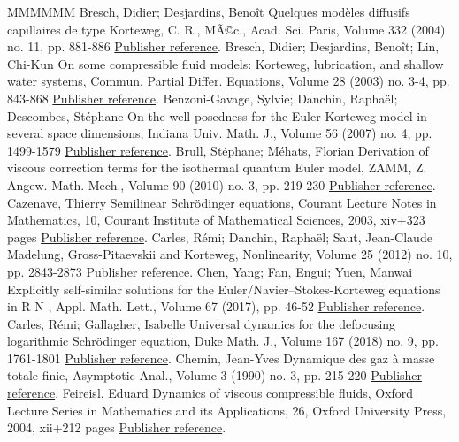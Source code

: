 \documentclass[11pt]{article}
\theoremstyle{definition}
\numberwithin{equation}{section}
\numberwithin{figure}{section}
\numberwithin{table}{section}
\newcommand*\<{\left\langle}
\renewcommand*\>{\right\rangle}
\begin{document}
\begin{thebibliography}{MMMMMM}
 Bresch, Didier; Desjardins, Benoît Quelques modèles diffusifs capillaires de type Korteweg, C. R., MÃ©c., Acad. Sci. Paris, Volume 332 (2004) no. 11, pp. 881-886 \href{https://ahl.centre-mersenne.org/item/AHL_2018__1__47_0/#BD04}{Publisher reference}.
 Bresch, Didier; Desjardins, Benoît; Lin, Chi-Kun On some compressible fluid models: Korteweg, lubrication, and shallow water systems, Commun. Partial Differ. Equations, Volume 28 (2003) no. 3-4, pp. 843-868 \href{https://ahl.centre-mersenne.org/item/AHL_2018__1__47_0/#Bre-De-CKL-03}{Publisher reference}.
 Benzoni-Gavage, Sylvie; Danchin, Raphaël; Descombes, Stéphane On the well-posedness for the Euler-Korteweg model in several space dimensions, Indiana Univ. Math. J., Volume 56 (2007) no. 4, pp. 1499-1579 \href{https://ahl.centre-mersenne.org/item/AHL_2018__1__47_0/#BDD07}{Publisher reference}.
 Brull, Stéphane; Méhats, Florian Derivation of viscous correction terms for the isothermal quantum Euler model, ZAMM, Z. Angew. Math. Mech., Volume 90 (2010) no. 3, pp. 219-230 \href{https://ahl.centre-mersenne.org/item/AHL_2018__1__47_0/#Bru-Me10}{Publisher reference}.
 Cazenave, Thierry Semilinear Schrödinger equations, Courant Lecture Notes in Mathematics, 10, Courant Institute of Mathematical Sciences, 2003, xiv+323 pages \href{https://ahl.centre-mersenne.org/item/AHL_2018__1__47_0/#CazCourant}{Publisher reference}.
 Carles, Rémi; Danchin, Raphaël; Saut, Jean-Claude Madelung, Gross-Pitaevskii and Korteweg, Nonlinearity, Volume 25 (2012) no. 10, pp. 2843-2873 \href{https://ahl.centre-mersenne.org/item/AHL_2018__1__47_0/#CaDaSa12}{Publisher reference}.
 Chen, Yang; Fan, Engui; Yuen, Manwai Explicitly self-similar solutions for the Euler/Navier–Stokes-Korteweg equations in R N , Appl. Math. Lett., Volume 67 (2017), pp. 46-52 \href{https://ahl.centre-mersenne.org/item/AHL_2018__1__47_0/#CFY17}{Publisher reference}.
 Carles, Rémi; Gallagher, Isabelle Universal dynamics for the defocusing logarithmic Schrödinger equation, Duke Math. J., Volume 167 (2018) no. 9, pp. 1761-1801 \href{https://ahl.centre-mersenne.org/item/AHL_2018__1__47_0/#CaGa18}{Publisher reference}.
 Chemin, Jean-Yves Dynamique des gaz à masse totale finie, Asymptotic Anal., Volume 3 (1990) no. 3, pp. 215-220 \href{https://ahl.centre-mersenne.org/item/AHL_2018__1__47_0/#JYC90}{Publisher reference}.
 Feireisl, Eduard Dynamics of viscous compressible fluids, Oxford Lecture Series in Mathematics and its Applications, 26, Oxford University Press, 2004, xii+212 pages \href{https://ahl.centre-mersenne.org/item/AHL_2018__1__47_0/#Fei04}{Publisher reference}.

\end{thebibliography}
\end{document}
